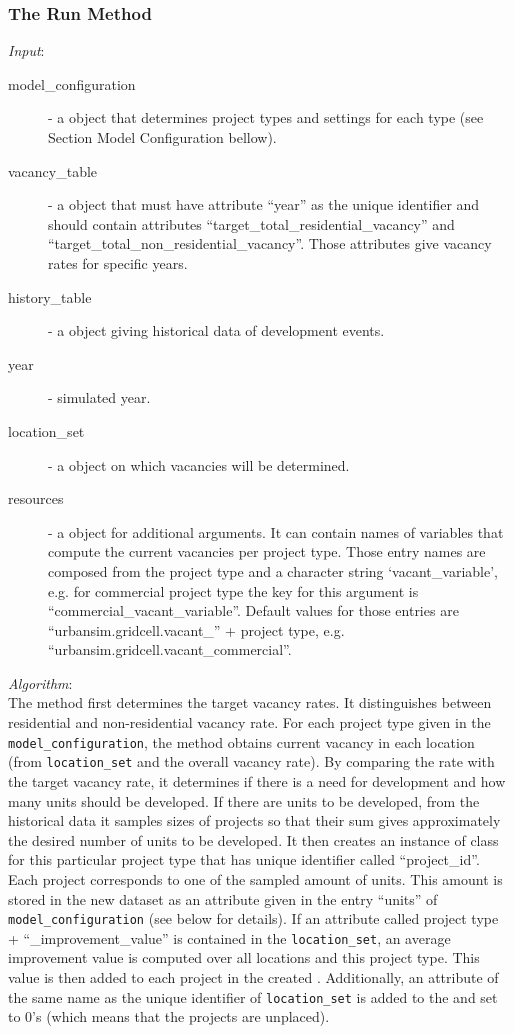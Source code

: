 \subsubsection{The Run Method}
%
{\it Input}:
\begin{description}
\item[model_configuration] - a  object that determines
  project types and settings for each type (see
  Section Model Configuration bellow).
\item[vacancy_table] - a  object that must have attribute 
  ``year'' as the unique identifier and should contain attributes 
  ``target_total_residential_vacancy'' and
  ``target_total_non_residential_vacancy''. Those attributes give vacancy
  rates for specific years.
\item[history_table] - a  object giving historical data of
  development events.
\item[year] - simulated year.
\item[location_set] - a  object on which vacancies will be
  determined.
\item[resources] - a  object for additional arguments. It can
  contain names of variables that compute the current vacancies per project
  type. Those entry names are composed from the project type and a character
  string `vacant_variable', e.g. for commercial project type the key for this
  argument is ``commercial_vacant_variable''.  Default values for those
  entries are ``urbansim.gridcell.vacant_'' + project type, e.g.
  ``urbansim.gridcell.vacant_commercial''.
\end{description}

{\it Algorithm}:~\\[1mm]
The method first determines the target vacancy rates. It distinguishes between
residential and non-residential vacancy rate.  For each project type given in
the \verb|model_configuration|, the method obtains current vacancy in each
location (from \verb|location_set| and the overall vacancy rate). By comparing
the rate with the target vacancy rate, it determines if there is a need for
development and how many units should be developed. If there are units to be
developed, from the historical data it samples sizes of projects so that their
sum gives approximately the desired number of units to be developed. It then
creates an instance of class  for this particular
project type that has unique identifier called ``project_id''. Each project
corresponds to one of the sampled amount of units. This amount is stored in
the new dataset as an attribute given in the entry ``units'' of
\verb|model_configuration| (see below for details). If an attribute called
project type + ``_improvement_value'' is contained in the \verb|location_set|,
an average improvement value is computed over all locations and this project
type. This value is then added to each project in the created
.  Additionally, an attribute of the same name as
the unique identifier of \verb|location_set| is added to the
 and set to 0's (which means that the projects
are unplaced).


